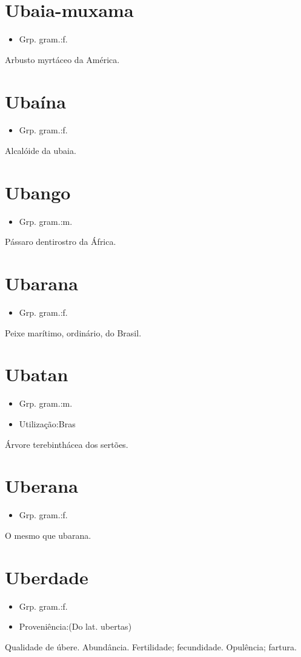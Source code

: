 \documentclass{article}
\begin{document}
\section{Ubaia-muxama}
\begin{itemize}
\item {Grp. gram.:f.}
\end{itemize}
Arbusto myrtáceo da América.
\section{Ubaína}
\begin{itemize}
\item {Grp. gram.:f.}
\end{itemize}
Alcalóide da ubaia.
\section{Ubango}
\begin{itemize}
\item {Grp. gram.:m.}
\end{itemize}
Pássaro dentirostro da África.
\section{Ubarana}
\begin{itemize}
\item {Grp. gram.:f.}
\end{itemize}
Peixe marítimo, ordinário, do Brasil.
\section{Ubatan}
\begin{itemize}
\item {Grp. gram.:m.}
\end{itemize}
\begin{itemize}
\item {Utilização:Bras}
\end{itemize}
Árvore terebinthácea dos sertões.
\section{Uberana}
\begin{itemize}
\item {Grp. gram.:f.}
\end{itemize}
O mesmo que \textunderscore ubarana\textunderscore .
\section{Uberdade}
\begin{itemize}
\item {Grp. gram.:f.}
\end{itemize}
\begin{itemize}
\item {Proveniência:(Do lat. \textunderscore ubertas\textunderscore )}
\end{itemize}
Qualidade de úbere.
Abundância.
Fertilidade; fecundidade.
Opulência; fartura.
\end{document}
